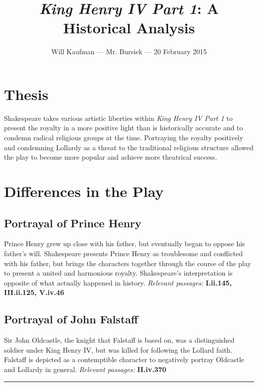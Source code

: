 \documentclass[10pt]{article}
\begin{document}
\title{\textit{King Henry IV Part 1}: A Historical Analysis}
\author{Will Kaufman --- Mr. Bursiek --- 20 February 2015}
\date{}
\maketitle

\section*{Thesis}
Shakespeare takes various artistic liberties within \textit{King Henry IV Part 1} to present the royalty in a more positive light than is historically accurate and to condemn radical religious groups at the time. Portraying the royalty positively and condemning Lollardy as a threat to the traditional religious structure allowed the play to become more popular and achieve more theatrical success.

\section*{Differences in the Play}
\subsection*{Portrayal of Prince Henry}
Prince Henry grew up close with his father, but eventually began to oppose his father's will.  Shakespeare presents Prince Henry as troublesome and conflicted with his father, but brings the characters together through the course of the play to present a united and harmonious royalty.  Shakespeare's interpretation is opposite of what actually happened in history.
\textit{Relevant passages: } \textbf{I.ii.145, III.ii.125, V.iv.46}

\subsection*{Portrayal of John Falstaff}
Sir John Oldcastle, the knight that Falstaff is based on, was a distinguished soldier under King Henry IV, but was killed for following the Lollard faith.  Falstaff is depicted as a contemptible character to negatively portray Oldcastle and Lollardy in general.
\textit{Relevant passages: } \textbf{II.iv.370}

\noindent\rule{\textwidth}{1pt}
\end{document}

